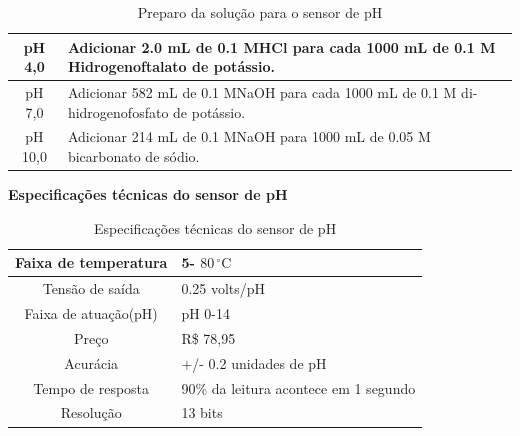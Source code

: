 \begin{table}[h]
\centering 
\begin{tabular}{|c|p{12cm}|}\hline
pH 4,0 	& Adicionar 2.0 mL de 0.1 MHCl para cada 1000 mL de 0.1 M Hidrogenoftalato de potássio.\\\hline
pH 7,0 	& Adicionar 582 mL de 0.1 MNaOH para cada 1000 mL de 0.1 M di-hidrogenofosfato de potássio.\\\hline
pH 10,0 & 	Adicionar 214 mL de 0.1 MNaOH para 1000 mL de 0.05 M bicarbonato de sódio.\\ \hline
\end{tabular}

\caption{Preparo da solução para o sensor de pH}
\end{table}
\FloatBarrier

\begin{center}\textbf{Especificações técnicas do sensor de pH}
\end{center}

\begin{table}[h]
\centering 
\begin{tabular}{|c|p{9cm}|}\hline
Faixa de temperatura&5- $80\,^{\circ}\mathrm{C}$\\ \hline
Tensão de saída	&0.25 volts/pH\\ \hline
Faixa de atuação(pH)& pH 0-14\\ \hline
Preço&R\$ 78,95\\ \hline
Acurácia&+/- 0.2 unidades de pH\\ \hline
Tempo de resposta&	90\% da leitura acontece em 1 segundo\\ \hline
Resolução&13 bits\\ \hline
\end{tabular}

\caption{Especificações técnicas do sensor de pH}
\end{table}
\FloatBarrier